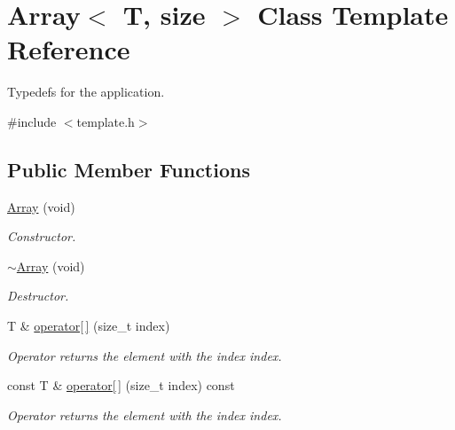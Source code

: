 \hypertarget{classArray}{\section{Array$<$ T, size $>$ Class Template Reference}
\label{classArray}
}


Typedefs for the application.  




{\ttfamily \#include $<$template.\-h$>$}

\subsection*{Public Member Functions}
\begin{DoxyCompactItemize}
\item 
\hypertarget{classArray_a5d56635d68d5e232ea1add891e5c6011}{\hyperlink{classArray_a5d56635d68d5e232ea1add891e5c6011}{Array} (void)}\label{classArray_a5d56635d68d5e232ea1add891e5c6011}

\begin{DoxyCompactList}\small\item\em Constructor. \end{DoxyCompactList}\item 
\hypertarget{classArray_a1a856ee487a0ba2fad309e234294f4f2}{\hyperlink{classArray_a1a856ee487a0ba2fad309e234294f4f2}{$\sim$\-Array} (void)}\label{classArray_a1a856ee487a0ba2fad309e234294f4f2}

\begin{DoxyCompactList}\small\item\em Destructor. \end{DoxyCompactList}\item 
T \& \hyperlink{classArray_a2cfcb63e168f5187ffb9d8e97f1d683e}{operator\mbox{[}$\,$\mbox{]}} (size\-\_\-t index)
\begin{DoxyCompactList}\small\item\em Operator returns the element with the index index. \end{DoxyCompactList}\item 
const T \& \hyperlink{classArray_ac2ed5d806f049cd35819ac8d6e5bada2}{operator\mbox{[}$\,$\mbox{]}} (size\-\_\-t index) const 
\begin{DoxyCompactList}\small\item\em Operator returns the element with the index index. \end{DoxyCompactList}\end{DoxyCompactItemize}


